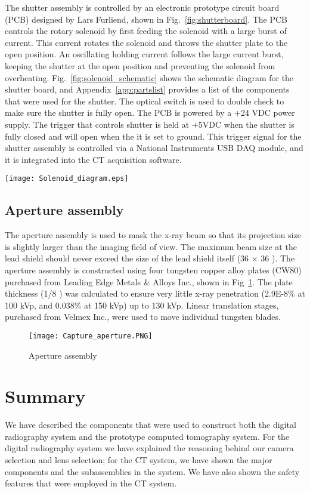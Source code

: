 The shutter assembly is controlled by an electronic prototype circuit board (PCB) designed by Lars Furliend, shown in Fig.~\ref{fig:shutterboard}.  The PCB controls the rotary solenoid by first feeding the solenoid with a large burst of current.  This current rotates the solenoid and throws the shutter plate to the open position.  An oscillating holding current follows the large current burst, keeping the shutter at the open position and preventing the solenoid from overheating.  Fig.~\ref{fig:solenoid_schematic} shows the schematic diagram for the shutter board, and Appendix~\ref{app:partslist} provides a list of the components that were used for the shutter.  The optical switch is used to double check to make sure the shutter is fully open.  The PCB is powered by a +24 VDC power supply.  The trigger that controls shutter is held at +5VDC when the shutter is fully closed and will open when the it is set to ground.  This trigger signal for the shutter assembly is controlled via a National Instruments USB DAQ module, and it is integrated into the CT acquisition software.
%
\begin{sidewaysfigure}[h]
\centering
\texttt{[image: Solenoid\_diagram.eps]}
\caption{Schematic for the solenoid PCB board}
\label{fig:solenoid_schematic}
\end{sidewaysfigure}
		
\subsection{Aperture assembly}
The aperture assembly is used to mask the x-ray beam so that its projection size is slightly larger than the imaging field of view.  The maximum beam size at the lead shield should never exceed the size of the lead shield itself (36 \inches $\times$ 36 \inches).  The aperture assembly is constructed using four tungsten copper alloy plates (CW80) purchased from Leading Edge Metals \& Alloys Inc., shown in Fig~\ref{fig:aperture}.  The plate thickness (1/8 \inches) was calculated to ensure very little x-ray penetration (2.9E-8\% at 100 kVp, and 0.038\% at 150 kVp) up to 130 kVp.  Linear translation stages, purchased from Velmex Inc., were used to move individual tungsten blades.
%
\begin{figure}[h]
\centering
\texttt{[image: Capture\_aperture.PNG]}
\caption{Aperture assembly}
\label{fig:aperture}
\end{figure}


\section{Summary}
We have described the components that were used to construct both the digital radiography system and the prototype computed tomography system.  For the digital radiography system we have explained the reasoning behind our camera selection and lens selection; for the CT system, we have shown the major components and the subassemblies in the system.  We have also shown the safety features that were employed in the CT system.  